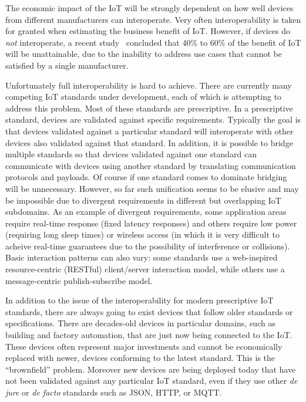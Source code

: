 The economic impact of the IoT will be strongly dependent on how well devices from 
different manufacturers can interoperate.
Very often interoperability is taken for granted when estimating the business
benefit of IoT. 
However,
if devices do \emph{not} interoperate,
a recent study~\cite{McK2015a} concluded that 40\% to 60\% of the 
benefit of IoT will be unattainable,
due to the inability to address use cases that cannot be satisfied by a single manufacturer.

Unfortunately full interoperability is hard to achieve.
There are currently many competing IoT standards under development,
each of which is attempting to address this problem.
Most of these standards are prescriptive.
In a prescriptive standard,
devices are validated against specific requirements.
Typically the goal is that devices validated against 
a particular standard will interoperate with
other devices also validated against that standard.
In addition, it is possible to bridge multiple standards so that
devices validated against one standard can communicate with
devices using another standard by translating communication protocols and payloads.
Of course if one standard comes to dominate bridging will be unnecessary.
However, so far such unification seems to be elusive and may be impossible due to
divergent requirements in different but overlapping IoT subdomains.
As an example of divergent requirements,
some application areas require real-time response (fixed latency responses)
and others require low power (requiring long sleep times) or wireless access
(in which it is very difficult to acheive real-time guarantees due to the
possibility of interference or collisions).
Basic interaction patterns can also vary: some standards use
a web-inspired resource-centric (RESTful) client/server interaction model,
while others use a message-centric publish-subscribe model.

In addition to the issue of the interoperability for modern prescriptive IoT standards,
there are always going to exist devices that follow older standards or specifications.
There are decades-old devices in particular domains, such as building and factory
automation, that are just now being connected to the IoT.
These devices often represent major investments and cannot be economically replaced with newer,
devices conforming to the latest standard.
This is the ``brownfield'' problem.
Moreover new devices are being deployed today that have not been validated
against any particular IoT standard,
even if they use other \textit{de jure} or \textit{de facto} standards such as JSON, HTTP, or MQTT.

